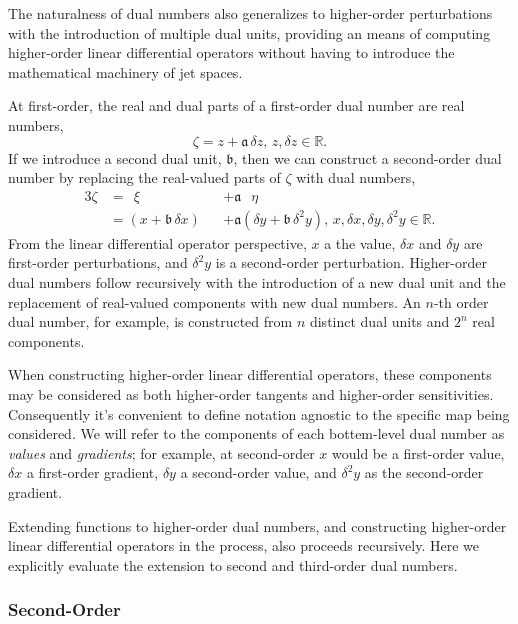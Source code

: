 The naturalness of dual numbers also generalizes to higher-order perturbations
with the introduction of multiple dual units, providing an means of computing
higher-order linear differential operators without having to introduce the mathematical
machinery of jet spaces.

At first-order, the real and dual parts of a first-order dual number are real numbers,
%
\begin{equation*}
\zeta = z + \mathfrak{a} \, \delta z, \, z, \delta z \in \mathbb{R}.
\end{equation*}
%
If we introduce a second dual unit, $\mathfrak{b}$, then we can construct a second-order 
dual number by replacing the real-valued parts of $\zeta$ with dual numbers,
%
\begin{alignat*}{3}
\zeta
&=
\;\, \xi
&&+ \mathfrak{a} \;\;\, \eta
\\
&=
\left( x + \mathfrak{b} \, \delta x \right)
&&+ \mathfrak{a} \left( \delta y + \mathfrak{b} \, \delta^{2} y \right), 
\, x, \delta x, \delta y, \delta^{2} y \in \mathbb{R}.
\end{alignat*}
%
From the linear differential operator perspective, $x$ a the value, $\delta x$ and 
$\delta y$ are first-order perturbations, and $\delta^{2} y$ is a second-order perturbation.
Higher-order dual numbers follow recursively with the introduction of a new dual unit
and the replacement of real-valued components with new dual numbers.  An $n$-th 
order dual number, for example, is constructed from $n$ distinct dual units and
$2^{n}$ real components.

When constructing higher-order linear differential operators, these components may 
be considered as both higher-order tangents and higher-order sensitivities. Consequently 
it's convenient to define notation agnostic to the specific map being considered.
We will refer to the components of each bottem-level dual number as \textit{values} and
\textit{gradients}; for example, at second-order $x$ would be a first-order value, $\delta x$ 
a first-order gradient, $\delta y$ a second-order value, and $\delta^{2} y$ as the second-order 
gradient.

Extending functions to higher-order dual numbers, and constructing higher-order
linear differential operators in the process, also proceeds recursively.  Here we
explicitly evaluate the extension to second and third-order dual numbers.

\subsubsection{Second-Order}

